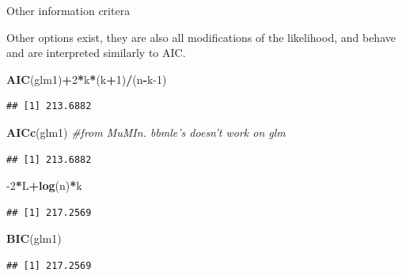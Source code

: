 \documentclass[
  ignorenonframetext,
]{beamer}
\newenvironment{Shaded}{\begin{snugshade}}{\end{snugshade}}
\newcommand{\CommentTok}[1]{\textcolor[rgb]{0.56,0.35,0.01}{\textit{#1}}}
\newcommand{\DecValTok}[1]{\textcolor[rgb]{0.00,0.00,0.81}{#1}}
\newcommand{\KeywordTok}[1]{\textcolor[rgb]{0.13,0.29,0.53}{\textbf{#1}}}
\newcommand{\NormalTok}[1]{#1}
\newcommand{\OperatorTok}[1]{\textcolor[rgb]{0.81,0.36,0.00}{\textbf{#1}}}
\begin{document}
\begin{frame}[fragile]{Other information critera}
\protect\hypertarget{other-information-critera}{}

Other options exist, they are also all modifications of the likelihood,
and behave and are interpreted similarly to AIC.

\begin{Shaded}
\begin{Highlighting}[]
\KeywordTok{AIC}\NormalTok{(glm1)}\OperatorTok{+}\DecValTok{2}\OperatorTok{*}\NormalTok{k}\OperatorTok{*}\NormalTok{(k}\OperatorTok{+}\DecValTok{1}\NormalTok{)}\OperatorTok{/}\NormalTok{(n}\OperatorTok{-}\NormalTok{k}\DecValTok{-1}\NormalTok{)}
\end{Highlighting}
\end{Shaded}

\begin{verbatim}
## [1] 213.6882
\end{verbatim}

\begin{Shaded}
\begin{Highlighting}[]
\KeywordTok{AICc}\NormalTok{(glm1) }\CommentTok{#from MuMIn. bbmle's doesn't work on glm}
\end{Highlighting}
\end{Shaded}

\begin{verbatim}
## [1] 213.6882
\end{verbatim}

\begin{Shaded}
\begin{Highlighting}[]
\DecValTok{-2}\OperatorTok{*}\NormalTok{L}\OperatorTok{+}\KeywordTok{log}\NormalTok{(n)}\OperatorTok{*}\NormalTok{k}
\end{Highlighting}
\end{Shaded}

\begin{verbatim}
## [1] 217.2569
\end{verbatim}

\begin{Shaded}
\begin{Highlighting}[]
\KeywordTok{BIC}\NormalTok{(glm1)}
\end{Highlighting}
\end{Shaded}

\begin{verbatim}
## [1] 217.2569
\end{verbatim}

\end{frame}
\end{document}
